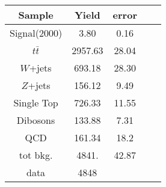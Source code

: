  \begin{center}
 \begin{tabular}{c | c c c c|} 
 \hline
    Sample         & Yield         & error \\
\hline
\hline
       Signal(2000)  &     3.80 &     0.16     \\
       
\hline
         $t\bar t$           & 2957.63    &   28.04    \\
\hline

       $W$+jets          & 693.18    &   28.30      \\       
       
\hline
        $Z$+jets          & 156.12    &   9.49      \\
\hline
        Single Top  & 726.33       & 11.55\\  
 \hline
        Dibosons  & 133.88      & 7.31\\  
 \hline
        QCD & 161.34      &18.2\\
 
  
\hline
\hline
     tot bkg. & 4841. & 42.87 \\
     \hline
    data & 4848 & \\
\hline
\end{tabular}
\end{center}
